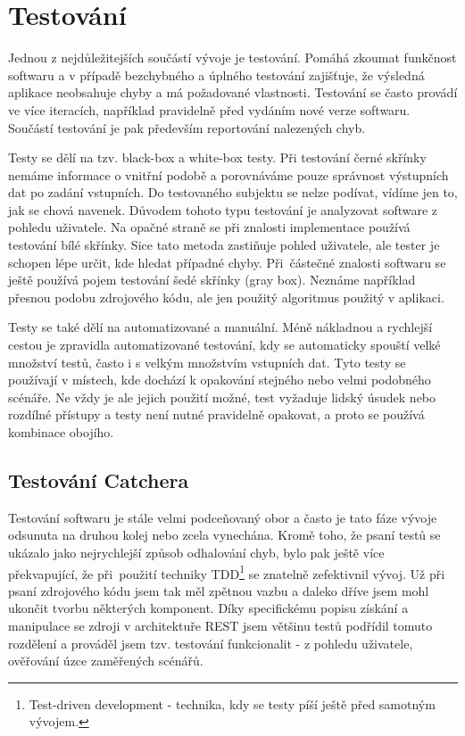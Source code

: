 \chapter{Testování}

Jednou z nejdůležitejších součástí vývoje je testování. Pomáhá zkoumat funkčnost softwaru a v případě bezchybného
a úplného testování zajišťuje, že výsledná aplikace neobsahuje chyby a má požadované vlastnosti.
Testování se často provádí ve více iteracích, například pravidelně před vydáním nové verze softwaru.
Součástí testování je pak především reportování nalezených chyb.

Testy se dělí na tzv. black-box a white-box testy. Při testování černé skřínky nemáme informace o vnitřní podobě a porovnáváme
pouze správnost výstupních dat po zadání vstupních. Do testovaného subjektu se nelze podívat, vídíme jen to, jak se chová navenek.
Důvodem tohoto typu testování je analyzovat software z pohledu uživatele.
Na opačné straně se při znalosti implementace používá testování bílé skřínky. Sice tato metoda zastiňuje pohled uživatele,
ale tester je schopen lépe určit, kde hledat případné chyby. Při~částečné znalosti softwaru se ještě používá pojem testování šedé skřínky (gray box).
Neznáme například přesnou podobu zdrojového kódu, ale jen použitý algoritmus použitý v aplikaci. 


Testy se také dělí na automatizované a manuální. Méně nákladnou a rychlejší cestou je zpravidla automatizované testování,
kdy se automaticky spouští velké množství testů, často i s velkým množstvím vstupních dat. Tyto testy se používají v místech,
kde dochází k opakování stejného nebo velmi podobného scénáře. Ne vždy je ale jejich použití možné, test vyžaduje lidský úsudek
nebo rozdílné přístupy a testy není nutné pravidelně opakovat, a proto se používá kombinace obojího. 

\section{Testování Catchera}

Testování softwaru je stále velmi podceňovaný obor a často je tato fáze vývoje odsunuta na druhou kolej nebo zcela vynechána.
Kromě toho, že psaní testů se ukázalo jako nejrychlejší způsob odhalování chyb, bylo pak ještě více překvapující, že při~použití
techniky TDD\footnote{Test-driven development - technika, kdy se testy píší ještě před samotným vývojem.} se znatelně zefektivnil
vývoj. Už při psaní zdrojového kódu jsem tak měl zpětnou vazbu a daleko dříve jsem mohl ukončit tvorbu některých komponent.
Díky specifickému popisu získání a manipulace se zdroji v architektuře REST jsem většinu testů podřídil tomuto rozdělení a prováděl
jsem tzv. testování funkcionalit - z pohledu uživatele, ověřování úzce zaměřených scénářů.

